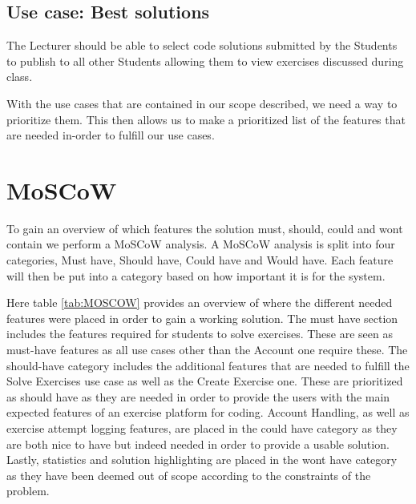 \subsection*{Use case: Best solutions} 
The Lecturer should be able to select code solutions submitted by the Students to publish to all other Students allowing them to view exercises discussed during class.

With the use cases that are contained in our scope described, we need a way to prioritize them. This then allows us to make a prioritized list of the features that are needed in-order to fulfill our use cases. 

\section{MoSCoW}
To gain an overview of which features the solution must, should, could and wont contain we perform a MoSCoW analysis.
A MoSCoW analysis is split into four categories, Must have, Should have, Could have and Would have. Each feature will then be put into a category based on how important it is for the system. 

Here table \ref{tab:MOSCOW} provides an overview of where the different needed features were placed in order to gain a working solution. 
The must have section includes the features required for students to solve exercises. These are seen as must-have features as all use cases other than the Account one require these.  
The should-have category includes the additional features that are needed to fulfill the Solve Exercises use case as well as the Create Exercise one. 
These are prioritized as should have as they are needed in order to provide the users with the main expected features of an exercise platform for coding. 
Account Handling, as well as exercise attempt logging features, are placed in the could have category as they are both nice to have but indeed needed in order to provide a usable solution. 
Lastly, statistics and solution highlighting are placed in the wont have category as they have been deemed out of scope according to the constraints of the problem.


